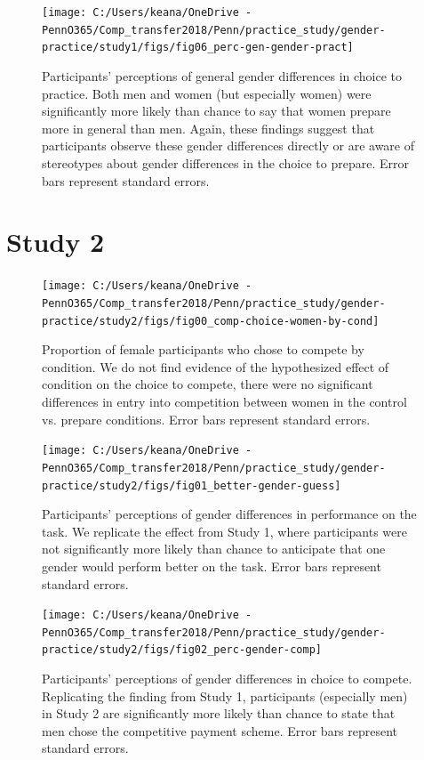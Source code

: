 \documentclass[a4paper, nobind]{templates/ociamthesis}
\begin{document}
\begin{figure}
\texttt{[image: C:/Users/keana/OneDrive - PennO365/Comp\_transfer2018/Penn/practice\_study/gender-practice/study1/figs/fig06\_perc-gen-gender-pract]} \caption{Participants' perceptions of general gender differences in choice to practice. Both men and women (but especially women) were significantly more likely than chance to say that women prepare more in general than men. Again, these findings suggest that participants observe these gender differences directly or are aware of stereotypes about gender differences in the choice to prepare. Error bars represent standard errors.}\label{fig:s106}
\end{figure}

\hypertarget{study-2-1}{%
\section{Study 2}\label{study-2-1}}

\begin{figure}
\texttt{[image: C:/Users/keana/OneDrive - PennO365/Comp\_transfer2018/Penn/practice\_study/gender-practice/study2/figs/fig00\_comp-choice-women-by-cond]} \caption{Proportion of female participants who chose to compete by condition. We do not find evidence of the hypothesized effect of condition on the choice to compete, there were no significant differences in entry into competition between women in the control vs. prepare conditions. Error bars represent standard errors.}\label{fig:s200}
\end{figure}

\begin{figure}
\texttt{[image: C:/Users/keana/OneDrive - PennO365/Comp\_transfer2018/Penn/practice\_study/gender-practice/study2/figs/fig01\_better-gender-guess]} \caption{Participants' perceptions of gender differences in performance on the task. We replicate the effect from Study 1, where participants were not significantly more likely than chance to anticipate that one gender would perform better on the task. Error bars represent standard errors.}\label{fig:s201}
\end{figure}

\begin{figure}
\texttt{[image: C:/Users/keana/OneDrive - PennO365/Comp\_transfer2018/Penn/practice\_study/gender-practice/study2/figs/fig02\_perc-gender-comp]} \caption{Participants' perceptions of gender differences in choice to compete. Replicating the finding from Study 1, participants (especially men) in Study 2 are significantly more likely than chance to state that men chose the competitive payment scheme. Error bars represent standard errors.}\label{fig:s202}
\end{figure}
\end{document}
